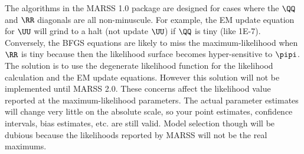 The algorithms in the MARSS 1.0 package are designed for cases where the $\QQ$ and $\RR$ diagonals are all non-minuscule.  For example, the EM update equation for $\UU$ will grind to a halt (not update $\UU$) if $\QQ$ is tiny (like 1E-7).  Conversely, the BFGS equations are likely to miss the maximum-likelihood when $\RR$ is tiny because then the likelihood surface becomes hyper-sensitive to $\pipi$.   The solution is to use the degenerate likelihood function for the likelihood calculation and the EM update equations.  However this solution will not be implemented until MARSS 2.0.  These concerns affect the likelihood value reported at the maximum-likelihood parameters. The actual parameter estimates will change very little on the absolute scale, so your point estimates, confidence intervals, bias estimates, etc. are still valid.  Model selection though will be dubious because the likelihoods reported by MARSS will not be the real maximums.